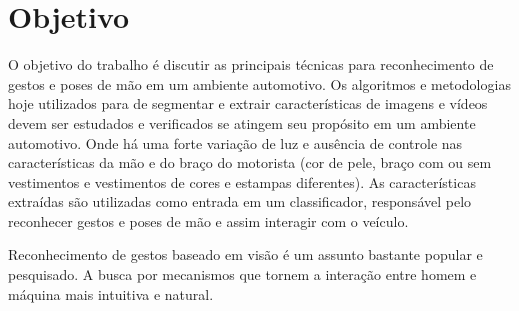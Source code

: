 \chapter{Objetivo}

O objetivo do trabalho é discutir as principais técnicas para reconhecimento de gestos e poses de mão em um ambiente automotivo.
Os algoritmos e metodologias hoje utilizados para de segmentar e extrair características de imagens e vídeos devem ser estudados e verificados se atingem seu propósito em um ambiente automotivo. Onde há uma forte variação de luz e ausência de controle nas características da mão e do braço do motorista (cor de pele, braço com ou sem vestimentos e vestimentos de cores e estampas diferentes). As características extraídas são utilizadas como entrada em um classificador, responsável pelo reconhecer gestos e poses de mão e assim interagir com o veículo. 

Reconhecimento de gestos baseado em visão é um assunto bastante popular e pesquisado. A busca por mecanismos que tornem a interação entre homem e máquina mais intuitiva e natural.
